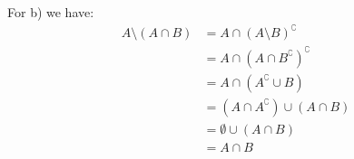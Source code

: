 \documentclass{article}
\begin{document}
For b) we have:
\begin{align*}
    A\setminus(A\cap B)&=A\cap(A\setminus B)^\complement\tag{relative complement}\\
    &=A\cap(A\cap B^\complement)^\complement\tag{relative complement}\\
    &=A\cap(A^\complement\cup B)\tag{DeMorgan's Law}\\
    &=(A\cap A^\complement)\cup (A\cap B)\tag{distributivity of intersection}\\
    &=\emptyset\cup (A\cap B)\\
    &=A\cap B\\
\end{align*}
\end{document}
